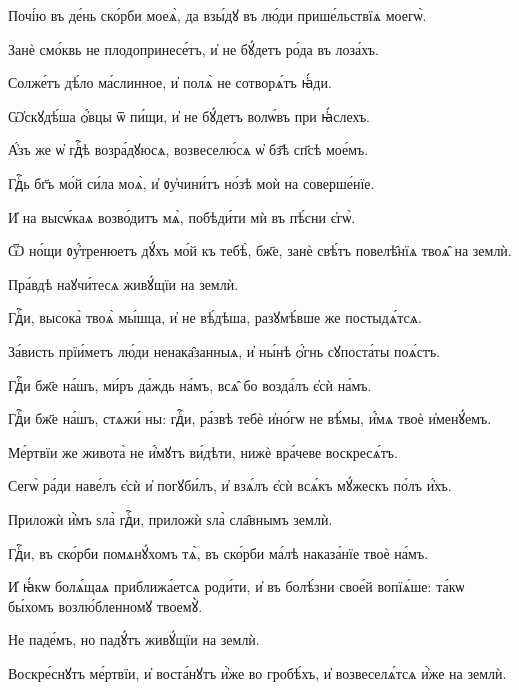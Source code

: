 \hKv Почі́ю въ де́нь ско́рби моеѧ̀, да взы́дꙋ въ лю́ди  прише́льствїѧ моегѡ̀.  
%

\hKv Занѐ смо́квь не плодопринесе́тъ, и҆ не бꙋ́детъ ро́да  въ лоза́хъ. 

\hKv Солже́тъ дѣ́ло ма́слинное, и҆ полѧ̀ не сотворѧ́тъ ꙗ҆́ди. 
%

\hKv Ѡ҆скꙋдѣ́ша ѻ҆́вцы ѿ пи́щи, и҆ не бꙋ́детъ волѡ́въ  при ꙗ҆́слехъ. 

\hKv А҆́зъ же ѡ҆ гдⷭ҇ѣ возра́дꙋюсѧ, возвеселю́сѧ ѡ҆ бз҃ѣ сп҃сѣ  мое́мъ. 
%

\hKv Гдⷭ҇ь бг҃ъ мо́й си́ла моѧ̀, и҆ ᲂу҆чини́тъ но́зѣ  моѝ на соверше́нїе. 

\hKv И҆ на высѡ́каѧ возво́дитъ мѧ̀, побѣди́ти мѝ въ пѣ́сни  є҆гѡ̀. 
%


\hKv Ѿ но́щи ᲂу҆́тренюетъ дꙋ́хъ мо́й къ тебѣ̀, бж҃е, занѐ  свѣ́тъ повелѣ̑нїѧ твоѧ̑ на землѝ. 

\hKv Пра́вдѣ наꙋчи́тесѧ живꙋ́щїи на землѝ. 
%

\hKv Гдⷭ҇и, высока̀ твоѧ̀ мы́шца, и҆ не вѣ́дѣша,  разꙋмѣ́вше же постыдѧ́тсѧ. 

\hKv За́висть прїи́метъ лю́ди ненака̑занныѧ, и҆ ны́нѣ ѻ҆́гнь  сꙋпоста́ты поѧ́стъ. 

\hKv Гдⷭ҇и бж҃е на́шъ, ми́ръ да́ждь на́мъ, всѧ̑ бо возда́лъ  є҆сѝ на́мъ. 

\hKv Гдⷭ҇и бж҃е на́шъ, стѧжи́ ны: гдⷭ҇и, ра́звѣ тебѐ и҆но́гѡ не  вѣ́мы, и҆́мѧ твоѐ и҆менꙋ́емъ. 

\hKv Ме́ртвїи же живота̀ не и҆́мꙋтъ ви́дѣти, нижѐ вра́чеве  воскресѧ́тъ. 

\hKv Сегѡ̀ ра́ди наве́лъ є҆сѝ и҆ погꙋби́лъ, и҆ взѧ́лъ є҆сѝ  всѧ́къ мꙋ́жескъ по́лъ и҆́хъ. 
%

\hKv Приложѝ и҆̀мъ ѕла̀ гдⷭ҇и, приложѝ ѕла̀ сла̑внымъ  землѝ. 

\hKv Гдⷭ҇и, въ ско́рби помѧнꙋ́хомъ тѧ̀, въ ско́рби ма́лѣ  наказа́нїе твоѐ на́мъ.  
%

\hKv И҆ ꙗ҆́кѡ болѧ́щаѧ приближа́етсѧ роди́ти, и҆ въ  болѣ́зни свое́й вопїѧ́ше: та́кѡ бы́хомъ возлю́бленномꙋ  твоемꙋ̀. 

\hKv Не паде́мъ, но падꙋ́тъ живꙋ́щїи на землѝ. 
%

\hKv Воскре́снꙋтъ ме́ртвїи, и҆ воста́нꙋтъ и҆̀же во  гробѣ́хъ, и҆ возвеселѧ́тсѧ и҆̀же на землѝ. 

